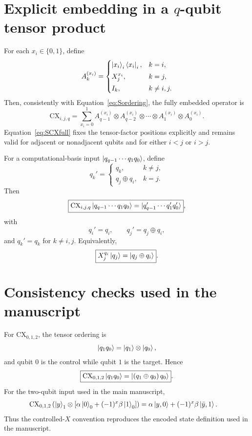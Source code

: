 \documentclass[11pt,a4paper]{article}
\newcommand{\CX}{\mathrm{CX}}
\begin{document}
\section{Explicit embedding in a $q$-qubit tensor product}

For each $x_i\in\{0,1\}$, define
\begin{equation}
A_k^{(x_i)}=
\begin{cases}
\ket{x_i}_i\bra{x_i}_i,&k=i,\\[1mm]
X_j^{x_i},&k=j,\\[1mm]
I_k,&k\neq i,j.
\end{cases}
\label{eq:SAk}
\end{equation}
Then, consistently with Equation~\eqref{eq:Sordering}, the fully embedded operator is
\begin{equation}
\boxed{
\CX_{i,j,q}
=
\sum_{x_i=0}^{1}
A_{q-1}^{(x_i)}\otimes A_{q-2}^{(x_i)}\otimes\cdots\otimes A_1^{(x_i)}\otimes A_0^{(x_i)}
}.
\label{eq:SCXfull}
\end{equation}
Equation~\eqref{eq:SCXfull} fixes the tensor-factor positions explicitly and remains valid for adjacent or nonadjacent qubits and for either $i<j$ or $i>j$.

For a computational-basis input $\ket{q_{q-1}\cdots q_1q_0}$, define
\begin{equation}
q_k'=
\begin{cases}
q_k,&k\neq j,\\[1mm]
q_j\oplus q_i,&k=j.
\end{cases}
\end{equation}
Then
\begin{equation}
\boxed{
\CX_{i,j,q}\ket{q_{q-1}\cdots q_1q_0}
=
\ket{q'_{q-1}\cdots q'_1q'_0}
},
\end{equation}
with
\begin{equation}
\boxed{q_i'=q_i,\qquad q_j'=q_j\oplus q_i},
\end{equation}
and $q_k'=q_k$ for $k\neq i,j$.  Equivalently,
\begin{equation}
\boxed{X_j^{q_i}\ket{q_j}=\ket{q_j\oplus q_i}}.
\end{equation}

\section{Consistency checks used in the manuscript}

For $\CX_{0,1,2}$, the tensor ordering is
\begin{equation}
\ket{q_1q_0}=\ket{q_1}\otimes\ket{q_0},
\end{equation}
and qubit $0$ is the control while qubit $1$ is the target.  Hence
\begin{equation}
\boxed{\CX_{0,1,2}\ket{q_1q_0}=\ket{(q_1\oplus q_0)\,q_0}}.
\label{eq:SCX01}
\end{equation}
For the two-qubit input used in the main manuscript,
\begin{align}
\CX_{0,1,2}
\left(
\ket{y}_1\otimes
\left[\alpha\ket{0}_0+(-1)^x\beta\ket{1}_0\right]
\right)
&=
\alpha\ket{y,0}+(-1)^x\beta\ket{\bar y,1}.
\label{eq:SBxy}
\end{align}
Thus the controlled-$X$ convention reproduces the encoded state definition used in the manuscript.
\end{document}
